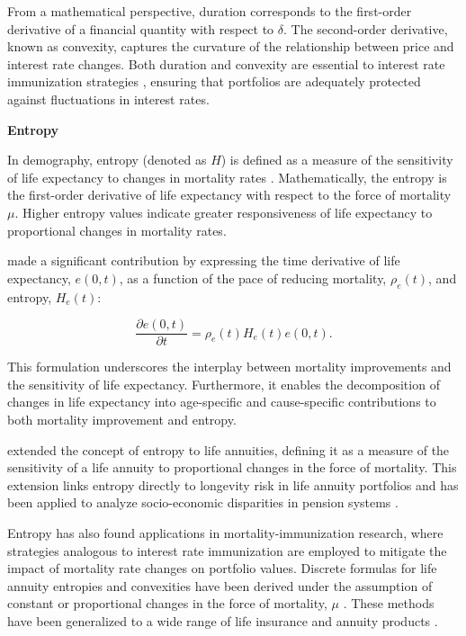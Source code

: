 \documentclass[12pt]{article}
\begin{document}
From a mathematical perspective, duration corresponds to the first-order derivative of a financial quantity with respect to $\delta$. The second-order derivative, known as convexity, captures the curvature of the relationship between price and interest rate changes. Both duration and convexity are essential to interest rate immunization strategies \citep{redington1951papers,fisher1971coping,shiu1990redington,santomero1997financial,courtois2007immunization}, ensuring that portfolios are adequately protected against fluctuations in interest rates.

\textbf{Entropy}

In demography, entropy (denoted as $H$) is defined as a measure of the sensitivity of life expectancy to changes in mortality rates \citep{leser1955variations,keyfitz1977difference,demetrius1974demographic,goldman1986new, aburto2019threshold}. Mathematically, the entropy is the first-order derivative of life expectancy with respect to the force of mortality $\mu$. Higher entropy values indicate greater responsiveness of life expectancy to proportional changes in mortality rates.

\citet{Vaupel2003} made a significant contribution by expressing the time derivative of life expectancy, $e(0, t)$, as a function of the pace of reducing mortality, $\rho_e(t)$, and entropy, $H_e(t)$:

\begin{equation}\label{eq:lifeexpdecomp}
	\dfrac{\partial e(0,t)}{\partial t} = \rho_e(t) H_e(t) e(0,t).
\end{equation}

This formulation underscores the interplay between mortality improvements and the sensitivity of life expectancy. Furthermore, it enables the decomposition of changes in life expectancy into age-specific and cause-specific contributions to both mortality improvement and entropy.

\citet{Haberman2011} extended the concept of entropy to life annuities, defining it as a measure of the sensitivity of a life annuity to proportional changes in the force of mortality. This extension links entropy directly to longevity risk in life annuity portfolios \citep{rabitti2020mortality} and has been applied to analyze socio-economic disparities in pension systems \citep{alvarez2021linking}.

Entropy has also found applications in mortality-immunization research, where strategies analogous to interest rate immunization are employed to mitigate the impact of mortality rate changes on portfolio values. Discrete formulas for life annuity entropies and convexities have been derived under the assumption of constant or proportional changes in the force of mortality, $\mu$ \citep{wang2010optimal,tsai2011actuarial,Tsai2013a,Li2011}. These methods have been generalized to a wide range of life insurance and annuity products \citep{li2012key,Li2012,Wong2015,Luciano2015,levantesi2018natural}.
\end{document}
